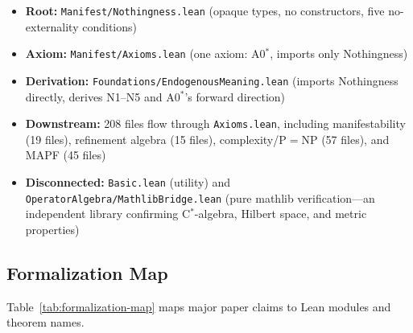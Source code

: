 \begin{itemize}[nosep]
  \item \textbf{Root:} \texttt{Manifest/Nothingness.lean} (opaque types,
        no constructors, five no-externality conditions)
  \item \textbf{Axiom:} \texttt{Manifest/Axioms.lean} (one axiom:
        A0$^*$, imports only Nothingness)
  \item \textbf{Derivation:} \texttt{Foundations/EndogenousMeaning.lean}
        (imports Nothingness directly, derives N1--N5 and A0$^*$'s
        forward direction)
  \item \textbf{Downstream:} 208 files flow through \texttt{Axioms.lean},
        including manifestability (19 files), refinement algebra (15 files),
        complexity/P$=$NP (57 files), and MAPF (45 files)
  \item \textbf{Disconnected:} \texttt{Basic.lean} (utility) and
        \texttt{OperatorAlgebra/MathlibBridge.lean} (pure mathlib
        verification---an independent library confirming C$^*$-algebra,
        Hilbert space, and metric properties)
\end{itemize}

\subsection{Formalization Map}
\label{app:formalization:map}

Table~\ref{tab:formalization-map} maps major paper claims to Lean
modules and theorem names.

